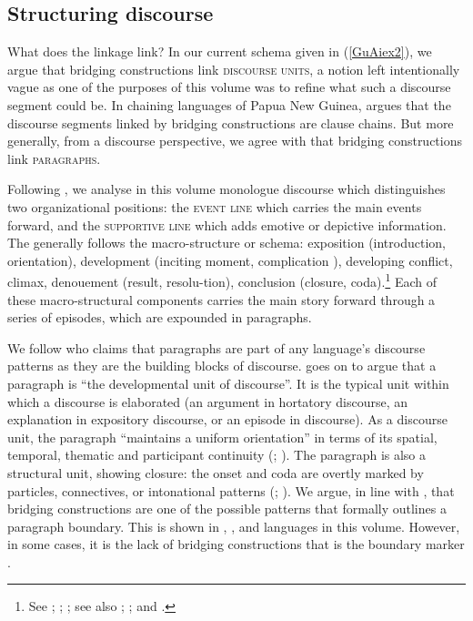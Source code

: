 \documentclass[output=paper]{LSP/langsci}
\begin{document}
\subsection{Structuring discourse} 
\label{GuAi43structdisc}

What does the linkage link? In our current schema given in (\ref{GuAiex2}), we argue that bridging constructions link \textsc{discourse units}, a notion left intentionally vague as one of the purposes of this volume was to refine what such a discourse segment could be. In chaining languages of Papua New Guinea,  \citet[][363]{devries.2005} argues that the discourse segments linked by bridging constructions are clause chains.  But more generally, from a discourse perspective, we agree with \citet[][272--274]{Thompson.et.al.2007} that bridging constructions link \textsc{paragraphs}. 

Following \citet[][14--17]{longacre83}, we analyse in this volume monologue discourse which distinguishes two organizational positions: the \textsc{event line} which carries the main events forward, and the \textsc{supportive line} which adds emotive or depictive information. The  generally follows the macro-structure or schema: exposition (introduction, orientation), development (inciting moment, complication ), developing conflict, climax, denouement (result, resolu-\linebreak tion), conclusion (closure, coda).\footnote{See \citealt[][277]{chafe01}; \citealt[][637--639]{johnstone01}; \citealt[][21--24, 38--41]{longacre83}; see also \citealt{Gleason68};  \citealt{Labov67}; and \citealt{Dijk77}.} Each of these macro-structural components carries the main story forward through a series of episodes, which are expounded in paragraphs. 

We follow  \citet[][116]{longacre79} who claims that paragraphs are part of any language’s discourse patterns as they are the building blocks of discourse. \citet[][295]{longacre83} goes on to argue that a paragraph is ``the developmental unit of discourse''. It is the typical unit within which a discourse  is elaborated (an argument in hortatory discourse, an explanation in expository discourse, or an episode in  discourse). As a discourse unit, the paragraph ``maintains a uniform orientation'' \citep[][136]{hinds79} in terms of its spatial, temporal, thematic and participant continuity (\citealt[][7--10]{givon83}; \citealt[][115--120]{longacre79}). The paragraph is also a structural unit, showing closure: the onset and coda are overtly marked by particles, connectives, or intonational patterns (\citealt[][Chap. 5]{Dijk77}; \citealt[][895--896]{seifart10}). We argue, in line with \citet[][9]{longacre83}, that bridging constructions are one of the possible patterns that formally outlines a paragraph boundary. This is shown in , ,  and  languages in this volume. However, in some cases, it is the lack of bridging constructions that is the boundary marker \citep[][337]{farr99}.
\end{document}
